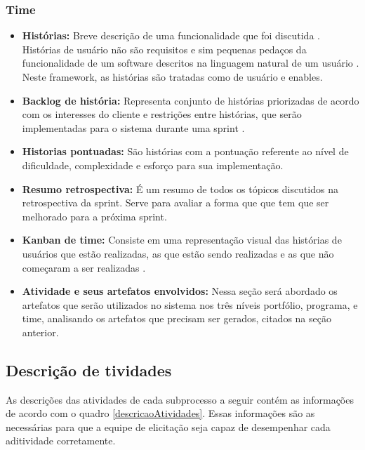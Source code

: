\subsubsection{Time}
\begin{itemize}
    \item \textbf{Histórias:} Breve descrição de uma funcionalidade que foi discutida \cite{leffingwell2011}. Histórias de usuário não são requisitos e sim pequenas pedaços da funcionalidade de um software descritos na linguagem natural de um usuário \cite{safe}. Neste framework, as histórias são tratadas como de usuário e enables.
    \item \textbf{Backlog de história:} Representa conjunto de histórias priorizadas de acordo com os interesses do cliente e restrições entre histórias, que serão implementadas para o sistema durante uma sprint \cite{safe}.
    \item \textbf{Historias pontuadas:} São histórias com a pontuação referente ao nível de dificuldade, complexidade e esforço para sua implementação.
    \item \textbf{Resumo retrospectiva:} É um resumo de todos os tópicos discutidos na retrospectiva da sprint. Serve para avaliar a forma que que tem que ser melhorado para a próxima sprint.
    \item \textbf{Kanban de time:} Consiste em uma representação visual das histórias de usuários que estão realizadas, as que estão sendo realizadas e as que não começaram a ser realizadas \cite{leffingwell2011}.
    \item \textbf{Atividade e seus artefatos envolvidos:} Nessa seção será abordado os artefatos que serão utilizados no sistema nos três níveis portfólio, programa, e time, analisando os artefatos que precisam ser gerados, citados na seção anterior.
\end{itemize}

\subsection{Descrição de tividades}

As descrições das atividades de cada subprocesso a seguir contém as informações de acordo com o quadro \ref{descricaoAtividades}. Essas informações são as necessárias para que a equipe de elicitação seja capaz de desempenhar cada aditividade corretamente.

